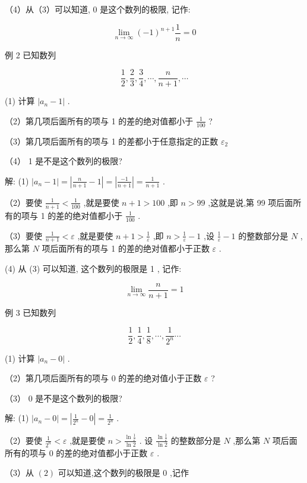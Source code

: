 \documentclass[lang=cn,newtx,10pt,scheme=chinese]{elegantbook}
\begin{document}
（4）从（3）可以知道, 0 是这个数列的极限, 记作:

\[
\mathop{\lim }\limits_{{n \rightarrow \infty }}{\left( -1\right) }^{n + 1}\frac{1}{n} = 0
\]

例 2 已知数列

\[
\frac{1}{2},\frac{2}{3},\frac{3}{4},\cdots ,\frac{n}{n + 1},\cdots
\]

(1) 计算 \(\left| {{a}_{n} - 1}\right|\) .

（2）第几项后面所有的项与 1 的差的绝对值都小于 \(\frac{1}{100}\) ?

（3）第几项后面所有的项与 1 的差都小于任意指定的正数 \({\varepsilon }_{2}\)

（4） 1 是不是这个数列的极限?

解: (1) \(\left| {{a}_{n} - 1}\right| = \left| {\frac{n}{n + 1} - 1}\right| = \left| \frac{-1}{n + 1}\right| = \frac{1}{n + 1}\) .

（2）要使 \(\frac{1}{n + 1} < \frac{1}{100}\) ,就是要使 \(n + 1 > {100}\) ,即 \(n > {99}\) ,这就是说,第 99 项后面所有的项与 1 的差的绝对值都小于 \(\frac{1}{100}\) .

（3）要使 \(\frac{1}{n + 1} < \varepsilon\) ,就是要使 \(n + 1 > \frac{1}{\varepsilon }\) ,即 \(n > \frac{1}{\varepsilon } - 1\) ,设 \(\frac{1}{\varepsilon } - 1\) 的整数部分是 \(N\) ,那么第 \(N\) 项后面所有的项与 1 的差的绝对值都小于正数 \(\varepsilon\) .

(4) 从 (3) 可以知道, 这个数列的极限是 1 , 记作:

\[
\mathop{\lim }\limits_{{n \rightarrow \infty }}\frac{n}{n + 1} = 1
\]

例 3 已知数列

\[
\frac{1}{2},\frac{1}{4},\frac{1}{8},\cdots ,\frac{1}{{2}^{n}}\cdots
\]

(1) 计算 \(\left| {{a}_{n} - 0}\right|\) .

（2）第几项后面所有的项与 0 的差的绝对值小于正数 \(\varepsilon\) ?

（3） 0 是不是这个数列的极限?

解: (1) \(\left| {{a}_{n} - 0}\right| = \left| {\frac{1}{{2}^{n}} - 0}\right| = \frac{1}{{2}^{n}}\) .

（2）要使 \(\frac{1}{{2}^{n}} < \varepsilon\) ,就是要使 \(n > \frac{\ln \frac{1}{\varepsilon }}{\ln 2}\) . 设 \(\frac{\ln \frac{1}{\varepsilon }}{\ln 2}\) 的整数部分是 \(N\) ,那么第 \(N\) 项后面所有的项与 0 的差的绝对值都小于正数 \(\varepsilon\) .

（3）从 \(\left( 2\right)\) 可以知道,这个数列的极限是 0 ,记作
\end{document}

